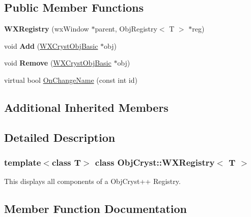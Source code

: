 \subsection*{Public Member Functions}
\begin{DoxyCompactItemize}
\item 
\mbox{\label{class_obj_cryst_1_1_w_x_registry_afb58c566db7148efa580ceb021a6e149}} 
{\bfseries W\+X\+Registry} (wx\+Window $\ast$parent, Obj\+Registry$<$ T $>$ $\ast$reg)
\item 
\mbox{\label{class_obj_cryst_1_1_w_x_registry_a03bc390fd462bfb8363dcf8da28bb36a}} 
void {\bfseries Add} (\mbox{\hyperlink{class_obj_cryst_1_1_w_x_cryst_obj_basic}{W\+X\+Cryst\+Obj\+Basic}} $\ast$obj)
\item 
\mbox{\label{class_obj_cryst_1_1_w_x_registry_af539e9e1b919e3753943ef6e16c63d27}} 
void {\bfseries Remove} (\mbox{\hyperlink{class_obj_cryst_1_1_w_x_cryst_obj_basic}{W\+X\+Cryst\+Obj\+Basic}} $\ast$obj)
\item 
virtual bool \mbox{\hyperlink{class_obj_cryst_1_1_w_x_registry_a2da67455f80e111092ed22410607e842}{On\+Change\+Name}} (const int id)
\end{DoxyCompactItemize}
\subsection*{Additional Inherited Members}


\subsection{Detailed Description}
\subsubsection*{template$<$class T$>$\newline
class Obj\+Cryst\+::\+W\+X\+Registry$<$ T $>$}

This displays all components of a Obj\+Cryst++ Registry. 

\subsection{Member Function Documentation}
\mbox{\label{class_obj_cryst_1_1_w_x_registry_a2da67455f80e111092ed22410607e842}} 
